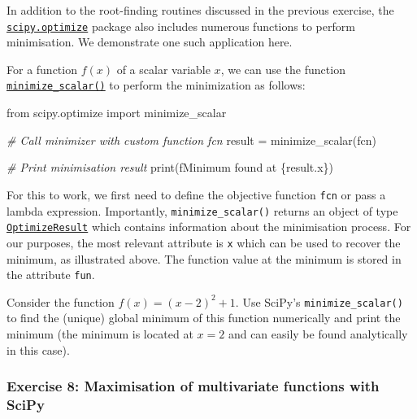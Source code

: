 \documentclass{scrartcl}
\newenvironment{Shaded}{}{}
\newcommand{\CommentTok}[1]{\textcolor[rgb]{0.38,0.63,0.69}{\textit{{#1}}}}
\newcommand{\NormalTok}[1]{{#1}}
\newcommand{\SpecialCharTok}[1]{\textcolor[rgb]{0.25,0.44,0.63}{{#1}}}
\newcommand{\SpecialStringTok}[1]{\textcolor[rgb]{0.73,0.40,0.53}{{#1}}}
\newcommand{\ImportTok}[1]{{#1}}
\newcommand{\OperatorTok}[1]{\textcolor[rgb]{0.40,0.40,0.40}{{#1}}}
\newcommand{\BuiltInTok}[1]{{#1}}
\begin{document}
In addition to the root-finding routines discussed in the previous
exercise, the
\href{https://docs.scipy.org/doc/scipy/reference/optimize.html}{\texttt{scipy.optimize}}
package also includes numerous functions to perform minimisation. We
demonstrate one such application here.

For a function \(f(x)\) of a scalar variable \(x\), we can use the
function
\href{https://docs.scipy.org/doc/scipy/reference/generated/scipy.optimize.minimize_scalar.html}{\texttt{minimize\_scalar()}}
to perform the minimization as follows:

    \begin{Shaded}
\begin{Highlighting}[]
\ImportTok{from}\NormalTok{ scipy.optimize }\ImportTok{import}\NormalTok{ minimize\_scalar}

\CommentTok{\# Call minimizer with custom function fcn}
\NormalTok{result }\OperatorTok{=}\NormalTok{ minimize\_scalar(fcn)}

\CommentTok{\# Print minimisation result}
\BuiltInTok{print}\NormalTok{(}\SpecialStringTok{f\textquotesingle{}Minimum found at }\SpecialCharTok{\{}\NormalTok{result}\SpecialCharTok{.x\}}\SpecialStringTok{\textquotesingle{}}\NormalTok{)}
\end{Highlighting}
\end{Shaded}

    For this to work, we first need to define the objective function
\texttt{fcn} or pass a lambda expression. Importantly,
\texttt{minimize\_scalar()} returns an object of type
\href{https://docs.scipy.org/doc/scipy/reference/generated/scipy.optimize.OptimizeResult.html}{\texttt{OptimizeResult}}
which contains information about the minimisation process. For our
purposes, the most relevant attribute is \texttt{x} which can be used to
recover the minimum, as illustrated above. The function value at the
minimum is stored in the attribute \texttt{fun}.

    Consider the function \(f(x) = (x - 2)^2 + 1\). Use SciPy's
\texttt{minimize\_scalar()} to find the (unique) global minimum of this
function numerically and print the minimum (the minimum is located at
\(x=2\) and can easily be found analytically in this case).

    \hypertarget{exercise-8-maximisation-of-multivariate-functions-with-scipy}{%
\subsubsection{Exercise 8: Maximisation of multivariate functions with
SciPy}\label{exercise-8-maximisation-of-multivariate-functions-with-scipy}}
\end{document}
